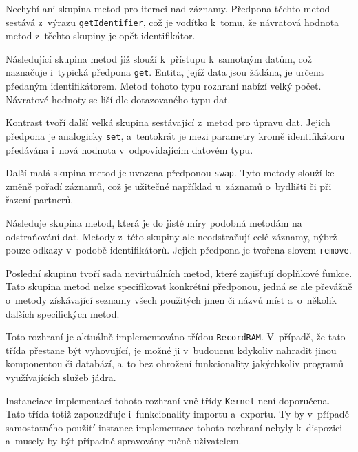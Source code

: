 		Nechybí ani skupina metod pro iteraci nad záznamy. Předpona těchto metod sestává z~výrazu \texttt{getIdentifier}, což je vodítko k~tomu, že návratová hodnota metod z~těchto skupiny je opět identifikátor. \par
		Následující skupina metod již slouží k~přístupu k~samotným datům, což naznačuje i~typická předpona \texttt{get}. Entita, jejíž data jsou žádána, je určena předaným identifikátorem. Metod tohoto typu rozhraní nabízí velký počet. Návratové hodnoty se liší dle dotazovaného typu dat. \par
		Kontrast tvoří další velká skupina sestávající z~metod pro úpravu dat. Jejich předpona je analogicky \texttt{set}, a~tentokrát je mezi parametry kromě identifikátoru předávána i~nová hodnota v~odpovídajícím datovém typu.\par
		Další malá skupina metod je uvozena předponou \texttt{swap}. Tyto metody slouží ke změně pořadí záznamů, což je užitečné například u~záznamů o~bydlišti či při řazení partnerů. \par
		Následuje skupina metod, která je do jisté míry podobná metodám na odstraňování dat. Metody z~této skupiny ale neodstraňují celé záznamy, nýbrž pouze odkazy v~podobě identifikátorů. Jejich předpona je tvořena slovem \texttt{remove}. \par
		Poslední skupinu tvoří sada nevirtuálních metod, které zajišťují doplňkové funkce. Tato skupina metod nelze specifikovat konkrétní předponou, jedná se ale převážně o~metody získávající seznamy všech použitých jmen či názvů míst a~o~několik dalších specifických metod.\par
		Toto rozhraní je aktuálně implementováno třídou \texttt{RecordRAM}. V~případě, že tato třída přestane být vyhovující, je možné ji v~budoucnu kdykoliv nahradit jinou komponentou či databází, a~to bez ohrožení funkcionality jakýchkoliv programů využívajících služeb jádra. \par
		Instanciace implementací tohoto rozhraní vně třídy \texttt{Kernel} není doporučena. Tato třída totiž zapouzdřuje i~funkcionality importu a~exportu. Ty by v~případě samostatného použití instance implementace tohoto rozhraní nebyly k~dispozici a~musely by být případně spravovány ručně uživatelem. \par
		
